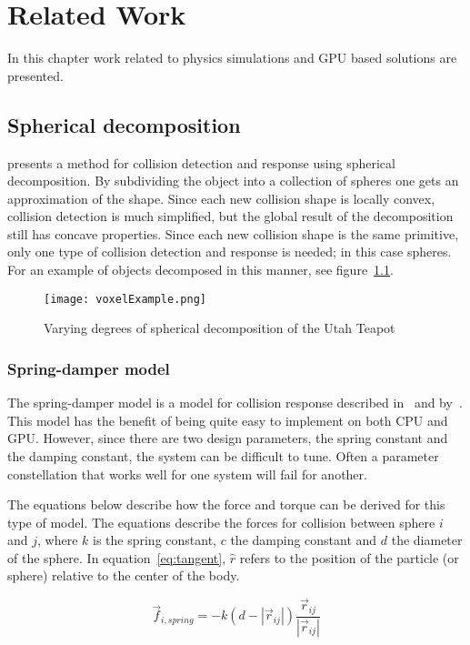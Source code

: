 \chapter{Related Work}\label{cha:related}
In this chapter work related to physics simulations and GPU based solutions are
presented.
\section{Spherical decomposition}\label{sec:decomp}
\cite{gpugems} presents a method for collision detection and response using spherical
decomposition. By subdividing the object into a collection of spheres one gets an
approximation of the shape. Since each new collision shape is locally convex, collision
detection is much simplified, but the global result of the decomposition still has
concave properties. Since each new collision shape is the same primitive, only
one type of collision detection and response is needed; in this case spheres.
For an example of objects
decomposed in this manner, see figure~\ref{fig:bunnies}.

\begin{figure}[H]
  \centering
  \texttt{[image: voxelExample.png]}
  \caption{Varying degrees of spherical decomposition of the Utah Teapot}
  \label{fig:bunnies}
\end{figure}

\subsection{Spring-damper model}
The spring-damper model is a model for collision response described in~\cite{gpugems} and by~\cite{fossum}.
This model has the benefit of being quite easy to implement on both CPU and GPU.
However, since there are two design parameters, the spring constant and the damping
constant, the system can be difficult to tune. Often a parameter constellation that works
well for one system will fail for another.

The equations below describe how the force and torque can be derived for this type
of model. The equations describe the forces for collision between sphere $i$ and $j$,
where $k$ is the spring constant, $c$ the damping constant and $d$ the
diameter of the sphere. In equation~\ref{eq:tangent}, $\hat{r}$ refers to the
position of the particle (or sphere) relative to the center of the body.

\begin{equation}
  \vec{f}_{i,spring} = -k(d-|\vec{r}_{ij}|)\frac{\vec{r}_{ij}}{|\vec{r}_{ij}|}
\end{equation}

